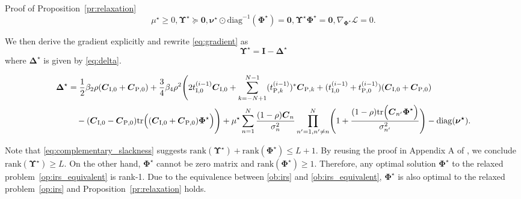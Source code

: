 \documentclass[journal]{IEEEtran}
\begin{document}
\begin{appendix}
\begin{subsection}{Proof of Proposition~\ref{pr:relaxation}}
\begin{subequations}
\begin{equation}
					\mu^\star \ge 0, \boldsymbol{\Upsilon}^\star \succeq \boldsymbol{0},
				\end{equation}
				\begin{equation}\label{eq:complementary_slackness}
					\boldsymbol{\nu}^\star \odot \mathrm{diag}^{-1}(\boldsymbol{\Phi}^\star) = \boldsymbol{0}, \boldsymbol{\Upsilon}^\star \boldsymbol{\Phi}^\star = \boldsymbol{0},
				\end{equation}
				\begin{equation}\label{eq:gradient}
					\nabla_{\boldsymbol{\Phi}^\star} \mathcal{L} = 0.
				\end{equation}
			\end{subequations}

			We then derive the gradient explicitly and rewrite \eqref{eq:gradient} as
			\begin{equation}
				\boldsymbol{\Upsilon}^\star = \boldsymbol{I} - \boldsymbol{\Delta}^\star
			\end{equation}
			where $\boldsymbol{\Delta}^\star$ is given by \eqref{eq:delta}.
			\begin{figure*}[!b]
				\begin{align}\label{eq:delta}
					\boldsymbol{\Delta}^\star
					&= \frac{1}{2} \beta_2 \rho (\boldsymbol{C}_{\mathrm{I},0}+\boldsymbol{C}_{\mathrm{P},0}) + \frac{3}{4} \beta_4 \rho^2
						\Biggl(
							2 t_{\mathrm{I},0}^{(i-1)} \boldsymbol{C}_{\mathrm{I},0} + \sum_{k=-N+1}^{N-1} (t_{\mathrm{P},k}^{(i-1)})^* \boldsymbol{C}_{\mathrm{P},k} + (t_{\mathrm{I},0}^{(i-1)} + t_{\mathrm{P},0}^{(i-1)}) (\boldsymbol{C}_{\mathrm{I},0} + \boldsymbol{C}_{\mathrm{P},0})\nonumber\\
					&\quad- (\boldsymbol{C}_{\mathrm{I},0} - \boldsymbol{C}_{\mathrm{P},0}) \mathrm{tr}\Bigl(
								(\boldsymbol{C}_{\mathrm{I},0} + \boldsymbol{C}_{\mathrm{P},0}) \boldsymbol{\Phi}^\star
							\Bigr)
						\Biggr) + \mu^\star \sum_{n=1}^N \frac{(1-\rho) \boldsymbol{C}_n}{\sigma_n^2} \prod_{n'=1,n' \ne n}^N \Biggl(
						1 + \frac{(1-\rho)\mathrm{tr}\Bigl(
							\boldsymbol{C}_{n'} \boldsymbol{\Phi}^\star
						\Bigr)}{\sigma_{n'}^2}
					\Biggr) - \mathrm{diag}(\boldsymbol{\nu^\star}).
				\end{align}
			\end{figure*}
			Note that \eqref{eq:complementary_slackness} suggests $\mathrm{rank}(\boldsymbol{\Upsilon}^\star)+\mathrm{rank}(\boldsymbol{\Phi}^\star) \le L+1$. By reusing the proof in Appendix A of \cite{Xu2020}, we conclude $\mathrm{rank}(\boldsymbol{\Upsilon}^\star) \ge L$. On the other hand, $\boldsymbol{\Phi}^\star$ cannot be zero matrix and $\mathrm{rank}(\boldsymbol{\Phi}^\star) \ge 1$. Therefore, any optimal solution $\boldsymbol{\Phi}^\star$ to the relaxed problem~\eqref{op:irs_equivalent} is rank-\num{1}. Due to the equivalence between \eqref{ob:irs} and \eqref{ob:irs_equivalent}, $\boldsymbol{\Phi}^\star$ is also optimal to the relaxed problem~\eqref{op:irs} and Proposition~\ref{pr:relaxation} holds.
		\end{subsection}


\end{appendix}
\end{document}
